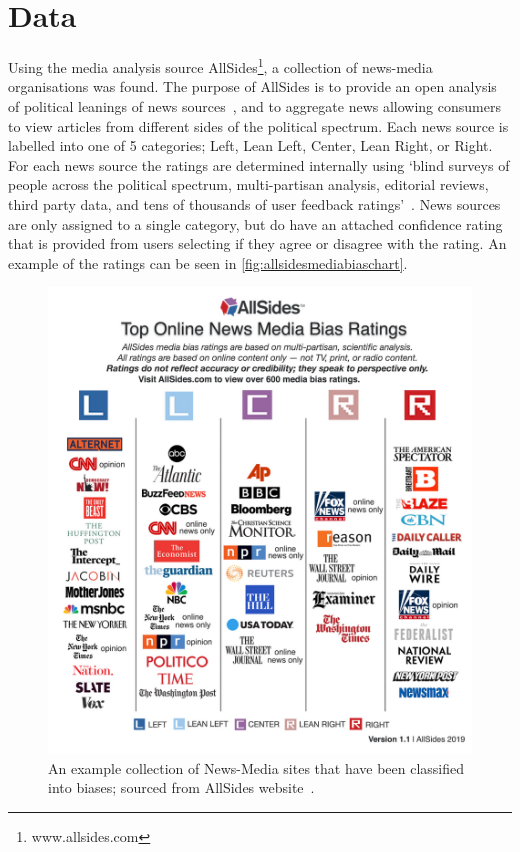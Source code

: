 \section{Data}

Using the media analysis source AllSides\footnote{www.allsides.com}, a collection of news-media organisations was found. The purpose of AllSides is to provide an open  analysis of political leanings of news sources~\cite{gable_media_2019}, and to aggregate news allowing consumers to view articles from different sides of the political spectrum. Each news source is labelled into one of 5 categories; {\color{Left}Left},
{\color{LeanLeft}Lean Left},
{\color{Center}Center},
{\color{LeanRight}Lean Right}, or
{\color{Right}Right}.
For each news source the ratings are determined internally using `blind surveys of people across the political spectrum, multi-partisan analysis, editorial reviews, third party data, and tens of thousands of user feedback ratings'~\cite{gable_media_2019}. News sources are only assigned to a single category, but do have an attached confidence rating that is provided from users selecting if they agree or disagree with the rating. An example of the ratings can be seen in \autoref{fig:allsidesmediabiaschart}.

\begin{figure}[!htbp]
	\centering
	\includegraphics[width=\linewidth]{chapter1/figs/AllSidesMediaBiasChart}
	\caption[An example collection of News-Media sites that have been classified into biases; sourced from AllSides website.]{An example collection of News-Media sites that have been classified into biases; sourced from AllSides website~\cite{gable_media_2019}.}
	\label{fig:allsidesmediabiaschart}
\end{figure}



